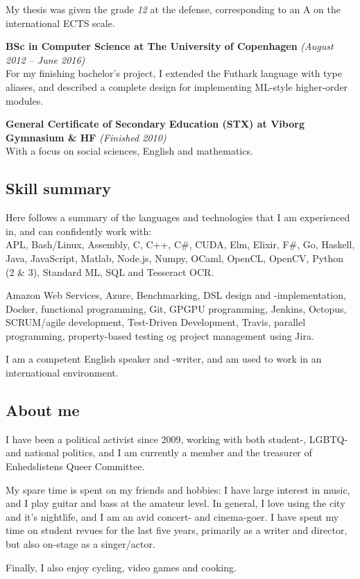 \documentclass[10pt, a4paper]{article}
\begin{document}
  My thesis was given the grade \textit{12} at the defense, corresponding to
  an A on the international ECTS scale.
  
\textbf{BSc in Computer Science at The University of Copenhagen} \textit{(August 2012 -- June 2016)}\\
  For my finishing bachelor's project, I extended the Futhark language with type
  aliases, and described a complete design for implementing ML-style higher-order modules.

\textbf{General Certificate of Secondary Education (STX) at Viborg Gymnasium \& HF} \textit{(Finished 2010)}\\
  With a focus on social sciences, English and mathematics.


  \pagebreak
\subsection*{Skill summary}
Here follows a summary of the languages and technologies that I am experienced in,
and can confidently work with:\\
APL, Bash/Linux, Assembly, C, C++, C\#, CUDA, Elm, Elixir, F\#, Go, Haskell,
Java, JavaScript, Matlab, Node.js, Numpy, OCaml, OpenCL, OpenCV, Python (2 \& 3),
Standard ML, SQL and Tesseract OCR.

Amazon Web Services, Azure, Benchmarking, DSL design and -implementation, Docker, functional
programming, Git, GPGPU programming, Jenkins, Octopus, SCRUM/agile development,
Test-Driven Development, Travis, parallel programming, property-based testing og
project management using Jira.

I am a competent English speaker and -writer, and am used to work in an
international environment.

\subsection*{About me}
I have been a political activist since 2009, working with both student-, LGBTQ-
and national politics, and I am currently a member and the treasurer of
Enhedslistens Queer Committee.

My spare time is spent on my friends and hobbies: I have large interest in music,
and I play guitar and bass at the amateur level.
In general, I love using the city and it's nightlife, and I am an avid concert- and
cinema-goer. I have spent my time on student revues for the last five years, primarily as a writer
and director, but also on-stage as a singer/actor.

Finally, I also enjoy cycling, video games and cooking.
\end{document}
